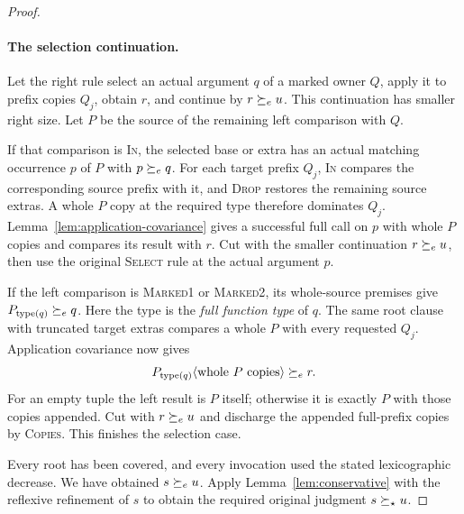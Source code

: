 \begin{proof}
\paragraph{The selection continuation.}
Let the right rule select an actual
argument $q$ of a marked owner $Q$,
apply it to prefix copies $Q_j$, obtain
$r$, and continue by $r\succeq_e u$.
This continuation has smaller right
size. Let $P$ be the source of the
remaining left comparison with $Q$.

If that comparison is \textsc{In},
the selected base or extra has an
actual matching occurrence $p$ of $P$
with $p\succeq_e q$. For each target prefix
$Q_j$, \textsc{In} compares the
corresponding source prefix with it,
and \textsc{Drop} restores the
remaining source extras. A whole $P$
copy at the required type therefore
dominates $Q_j$.
Lemma~\ref{lem:application-covariance}
gives a successful full call on $p$
with whole $P$ copies and compares
its result with $r$. Cut with the
smaller continuation $r\succeq_e u$,
then use the original \textsc{Select}
rule at the actual argument $p$.

If the left comparison is
\textsc{Marked1} or \textsc{Marked2},
its whole-source premises give
$P_{\operatorname{type}(q)}\succeq_e q$.
Here the type is the \emph{full
function type} of $q$.
The same root clause with truncated
target extras compares a whole $P$
with every requested $Q_j$.
Application covariance now gives
\[
 P_{\operatorname{type}(q)}\langle \text{whole }P\text{ copies}\rangle\succeq_e r.
\]
For an empty tuple the left result is
$P$ itself; otherwise it is exactly
$P$ with those copies appended.
Cut with $r\succeq_e u$ and discharge
the appended full-prefix copies by
\textsc{Copies}. This finishes the
selection case.

Every root has been covered, and
every invocation used the stated
lexicographic decrease. We have
obtained $s\succeq_e u$.
Apply Lemma~\ref{lem:conservative}
with the reflexive refinement of $s$
to obtain the required original
judgment $s\succeq_\star u$.
\end{proof}
